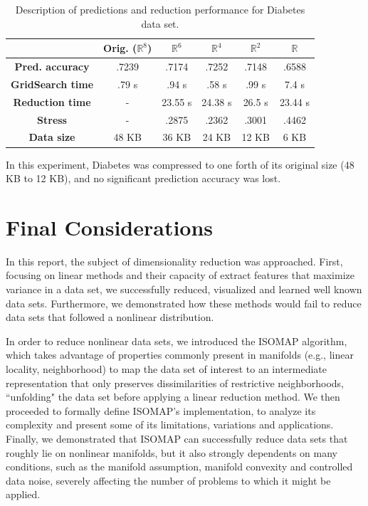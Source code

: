 \documentclass[12pt]{report}
\begin{document}
\begin{table}[H]
	\centering
	\begin{tabular}{|c|c|c|c|c|c|}
		\hline
		& \textbf{Orig. ($\mathbb{R}^{8}$}) & \textbf{$\mathbb{R}^{6}$} & \textbf{$\mathbb{R}^{4}$} & \textbf{$\mathbb{R}^{2}$} & \textbf{$\mathbb{R}$} \\\hline
		\textbf{Pred. accuracy}   & .7239 & .7174 & .7252 & .7148 & .6588 \\\hline
		\textbf{GridSearch time}   & .79 s & .94 s & .58 s & .99 s & 7.4 s \\\hline
		\textbf{Reduction time}    & - & 23.55 s & 24.38 s & 26.5 s & 23.44 s \\\hline
		\textbf{Stress} & - & .2875 & .2362 & .3001 & .4462 \\\hline
		\textbf{Data size}  & 48 KB & 36 KB & 24 KB & 12 KB & 6 KB \\\hline
	\end{tabular}
	\captionsetup{justification=centering}
	\caption{Description of predictions and reduction performance for Diabetes data set.}
\end{table}

In this experiment, Diabetes was compressed to one forth of its original size (48 KB to 12 KB), and no significant prediction accuracy was lost.

\newpage
\setcounter{secnumdepth}{-1}
\chapter{Final Considerations}

In this report, the subject of dimensionality reduction was approached. First, focusing on linear methods and their capacity of extract features that maximize variance in a data set, we successfully reduced, visualized and learned well known data sets. Furthermore, we demonstrated how these methods would fail to reduce data sets that followed a nonlinear distribution.

In order to reduce nonlinear data sets, we introduced the ISOMAP algorithm, which takes advantage of properties commonly present in manifolds (e.g., linear locality, neighborhood) to map the data set of interest to an intermediate representation that only preserves dissimilarities of restrictive neighborhoods, ``unfolding" the data set before applying a linear reduction method. We then proceeded to formally define ISOMAP's implementation, to analyze its complexity and present some of its limitations, variations and applications. Finally, we demonstrated that ISOMAP can successfully reduce data sets that roughly lie on nonlinear manifolds, but it also strongly dependents on many conditions, such as the manifold assumption, manifold convexity and controlled data noise, severely affecting the number of problems to which it might be applied.
\end{document}
